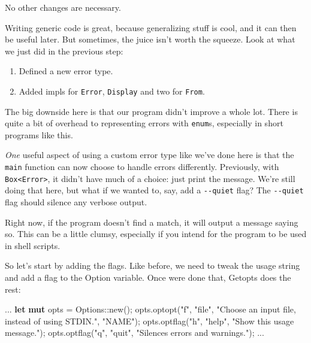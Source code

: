 \documentclass[a4paper,]{book}
\newenvironment{Shaded}{\begin{snugshade}}{\end{snugshade}}
\newcommand{\KeywordTok}[1]{\textcolor[rgb]{0.13,0.29,0.53}{\textbf{{#1}}}}
\newcommand{\StringTok}[1]{\textcolor[rgb]{0.31,0.60,0.02}{{#1}}}
\newcommand{\NormalTok}[1]{{#1}}
\providecommand{\tightlist}{%
  \setlength{\itemsep}{0pt}\setlength{\parskip}{0pt}}
\begin{document}
No other changes are necessary.


Writing generic code is great, because generalizing stuff is cool, and
it can then be useful later. But sometimes, the juice isn't worth the
squeeze. Look at what we just did in the previous step:

\begin{enumerate}
\def\labelenumi{\arabic{enumi}.}
\tightlist
\item
  Defined a new error type.
\item
  Added impls for \texttt{Error}, \texttt{Display} and two for
  \texttt{From}.
\end{enumerate}

The big downside here is that our program didn't improve a whole lot.
There is quite a bit of overhead to representing errors with
\texttt{enum}s, especially in short programs like this.

\emph{One} useful aspect of using a custom error type like we've done
here is that the \texttt{main} function can now choose to handle errors
differently. Previously, with
\texttt{Box\textless{}Error\textgreater{}}, it didn't have much of a
choice: just print the message. We're still doing that here, but what if
we wanted to, say, add a \texttt{-\/-quiet} flag? The \texttt{-\/-quiet}
flag should silence any verbose output.

Right now, if the program doesn't find a match, it will output a message
saying so. This can be a little clumsy, especially if you intend for the
program to be used in shell scripts.

So let's start by adding the flags. Like before, we need to tweak the
usage string and add a flag to the Option variable. Once were done that,
Getopts does the rest:

\begin{Shaded}
\begin{Highlighting}[]
\NormalTok{...}
\KeywordTok{let} \KeywordTok{mut} \NormalTok{opts = Options::new();}
\NormalTok{opts.optopt(}\StringTok{"f"}\NormalTok{, }\StringTok{"file"}\NormalTok{, }\StringTok{"Choose an input file, instead of using STDIN."}\NormalTok{, }\StringTok{"NAME"}\NormalTok{);}
\NormalTok{opts.optflag(}\StringTok{"h"}\NormalTok{, }\StringTok{"help"}\NormalTok{, }\StringTok{"Show this usage message."}\NormalTok{);}
\NormalTok{opts.optflag(}\StringTok{"q"}\NormalTok{, }\StringTok{"quit"}\NormalTok{, }\StringTok{"Silences errors and warnings."}\NormalTok{);}
\NormalTok{...}
\end{Highlighting}
\end{Shaded}
\end{document}
